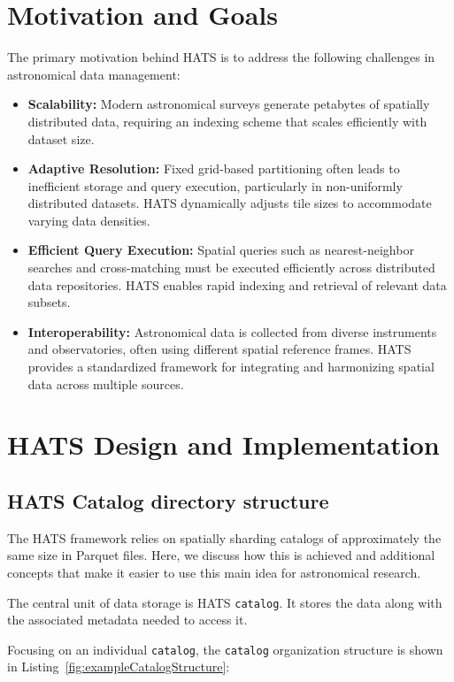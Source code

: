 \documentclass[11pt,a4paper]{ivoa}
\begin{document}
\section{Motivation and Goals}
    The primary motivation behind HATS is to address the following challenges in astronomical data management:
    \begin{itemize}
        \item \textbf{Scalability:} Modern astronomical surveys generate petabytes of spatially distributed data, requiring an indexing scheme that scales efficiently with dataset size.
        \item \textbf{Adaptive Resolution:} Fixed grid-based partitioning often leads to inefficient storage and query execution, particularly in non-uniformly distributed datasets. HATS dynamically adjusts tile sizes to accommodate varying data densities.
        \item \textbf{Efficient Query Execution:} Spatial queries such as nearest-neighbor searches and cross-matching must be executed efficiently across distributed data repositories. HATS enables rapid indexing and retrieval of relevant data subsets.
        \item \textbf{Interoperability:} Astronomical data is collected from diverse instruments and observatories, often using different spatial reference frames. HATS provides a standardized framework for integrating and harmonizing spatial data across multiple sources.
    \end{itemize}

\section{HATS Design and Implementation}

\subsection{HATS Catalog directory structure} \label{sec:catalog}

The HATS framework relies on spatially sharding catalogs 
of approximately the same size in Parquet files. Here, we discuss how this is achieved and
additional concepts that make it easier to use this main idea for astronomical
research.

The central unit of data storage is HATS \texttt{catalog}. 
It stores the data along with the associated metadata needed to access it. 

Focusing on an individual  \texttt{catalog}, the  \texttt{catalog} organization structure is shown in Listing~\ref{fig:exampleCatalogStructure}:
\end{document}
